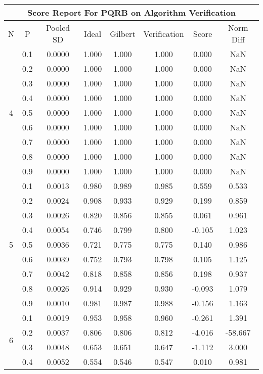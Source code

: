 \documentclass[11pt,a4paper]{report}
\begin{document}
\begin{longtable}{ | c | c || c | c | c | c | c | c | }
\hline
\multicolumn{8}{|c|}{ Score Report For PQRB on Algorithm Verification} \\
\hline
N & P & Pooled SD &  Ideal &  Gilbert & Verification  & Score & Norm Diff \\
 \hline
 \hline
 \endhead
\multirow{9}{*}{4} & 0.1 & 0.0000 & 1.000 & 1.000 & 1.000 & 0.000 & NaN \\
 & 0.2 & 0.0000 & 1.000 & 1.000 & 1.000 & 0.000 & NaN \\
 & 0.3 & 0.0000 & 1.000 & 1.000 & 1.000 & 0.000 & NaN \\
 & 0.4 & 0.0000 & 1.000 & 1.000 & 1.000 & 0.000 & NaN \\
 & 0.5 & 0.0000 & 1.000 & 1.000 & 1.000 & 0.000 & NaN \\
 & 0.6 & 0.0000 & 1.000 & 1.000 & 1.000 & 0.000 & NaN \\
 & 0.7 & 0.0000 & 1.000 & 1.000 & 1.000 & 0.000 & NaN \\
 & 0.8 & 0.0000 & 1.000 & 1.000 & 1.000 & 0.000 & NaN \\
 & 0.9 & 0.0000 & 1.000 & 1.000 & 1.000 & 0.000 & NaN \\
 \hline
\multirow{9}{*}{5} & 0.1 & 0.0013 & 0.980 & 0.989 & 0.985 & 0.559 & 0.533 \\
 & 0.2 & 0.0024 & 0.908 & 0.933 & 0.929 & 0.199 & 0.859 \\
 & 0.3 & 0.0026 & 0.820 & 0.856 & 0.855 & 0.061 & 0.961 \\
 & 0.4 & 0.0054 & 0.746 & 0.799 & 0.800 & -0.105 & 1.023 \\
 & 0.5 & 0.0036 & 0.721 & 0.775 & 0.775 & 0.140 & 0.986 \\
 & 0.6 & 0.0039 & 0.752 & 0.793 & 0.798 & 0.105 & 1.125 \\
 & 0.7 & 0.0042 & 0.818 & 0.858 & 0.856 & 0.198 & 0.937 \\
 & 0.8 & 0.0026 & 0.914 & 0.929 & 0.930 & -0.093 & 1.079 \\
 & 0.9 & 0.0010 & 0.981 & 0.987 & 0.988 & -0.156 & 1.163 \\
 \hline
\multirow{9}{*}{6} & 0.1 & 0.0019 & 0.953 & 0.958 & 0.960 & -0.261 & 1.391 \\
 & 0.2 & 0.0037 & 0.806 & 0.806 & 0.812 & -4.016 & -58.667 \\
 & 0.3 & 0.0048 & 0.653 & 0.651 & 0.647 & -1.112 & 3.000 \\
 & 0.4 & 0.0052 & 0.554 & 0.546 & 0.547 & 0.010 & 0.981 \\

\end{longtable}
\end{document}
